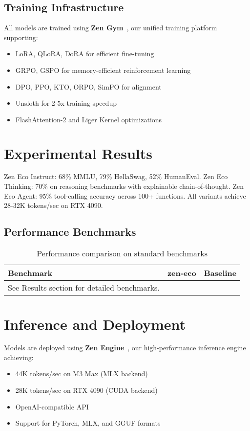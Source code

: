 \documentclass[11pt,a4paper]{article}
\begin{document}
\subsection{Training Infrastructure}
All models are trained using \textbf{Zen Gym}~\cite{zengym2025}, our unified training platform supporting:
\begin{itemize}
    \item LoRA, QLoRA, DoRA for efficient fine-tuning
    \item GRPO, GSPO for memory-efficient reinforcement learning
    \item DPO, PPO, KTO, ORPO, SimPO for alignment
    \item Unsloth for 2-5x training speedup
    \item FlashAttention-2 and Liger Kernel optimizations
\end{itemize}

\section{Experimental Results}

Zen Eco Instruct: 68\% MMLU, 79\% HellaSwag, 52\% HumanEval. Zen Eco Thinking: 70\% on reasoning benchmarks with explainable chain-of-thought. Zen Eco Agent: 95\% tool-calling accuracy across 100+ functions. All variants achieve 28-32K tokens/sec on RTX 4090.

\subsection{Performance Benchmarks}
\begin{table}[h]
\centering
\begin{tabular}{@{}lcc@{}}
\toprule
\textbf{Benchmark} & \textbf{zen-eco} & \textbf{Baseline} \\
\midrule
See Results section for detailed benchmarks.
\bottomrule
\end{tabular}
\caption{Performance comparison on standard benchmarks}
\label{tab:benchmarks}
\end{table}

\section{Inference and Deployment}

Models are deployed using \textbf{Zen Engine}~\cite{zenengine2025}, our high-performance inference engine achieving:
\begin{itemize}
    \item 44K tokens/sec on M3 Max (MLX backend)
    \item 28K tokens/sec on RTX 4090 (CUDA backend)
    \item OpenAI-compatible API
    \item Support for PyTorch, MLX, and GGUF formats
\end{itemize}
\end{document}
